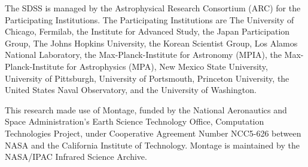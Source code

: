 \documentclass[10pt,preprint]{aastex}
\begin{document}
The SDSS is managed by the Astrophysical Research Consortium (ARC) for
the Participating Institutions. The Participating Institutions are The
University of Chicago, Fermilab, the Institute for Advanced Study, the
Japan Participation Group, The Johns Hopkins University, the Korean
Scientist Group, Los Alamos National Laboratory, the
Max-Planck-Institute for Astronomy (MPIA), the Max-Planck-Institute
for Astrophysics (MPA), New Mexico State University, University of
Pittsburgh, University of Portsmouth, Princeton University, the United
States Naval Observatory, and the University of Washington.

This research made use of Montage, funded by the National Aeronautics and
Space Administration's Earth Science Technology Office, Computation
Technologies Project, under Cooperative Agreement Number NCC5-626 between
NASA and the California Institute of Technology. Montage is maintained by
the NASA/IPAC Infrared Science Archive.




\newpage


%
\end{document}
